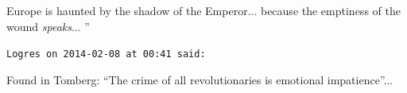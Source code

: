 \begin{footnotesize}
\begin{sffamily}
Europe is haunted by the shadow of the Emperor... because the emptiness of the wound \emph{speaks}... ''

\hfill

\texttt{Logres on 2014-02-08 at 00:41 said:}

Found in Tomberg: ``The crime of all revolutionaries is emotional impatience''... 

\hfill

\end{sffamily}
\end{footnotesize}

